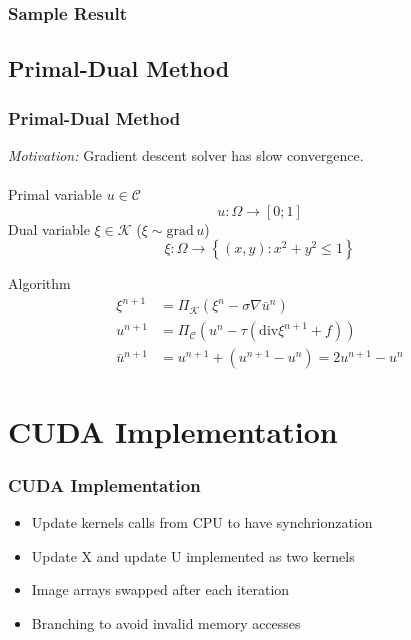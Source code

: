 \documentclass{beamer}
\begin{document}
\begin{frame}
  \frametitle{Sample Result}

\end{frame}

\subsection{Primal-Dual Method}

\begin{frame}
  \frametitle{Primal-Dual Method}
  \emph{Motivation:} Gradient descent solver has slow convergence.
  \\~\\
  Primal variable $ u \in \mathcal{C} $
  \begin{equation*}
    u : \Omega \to [0; 1]
  \end{equation*}
  Dual variable $ \xi \in \mathcal{K} $ \quad ($ \xi \sim \mathrm{grad} \, u $)
  \begin{equation*}
    \xi : \Omega \to \left\{ (x, y) : x^2 + y^2 \le 1 \right\}
  \end{equation*}

  Algorithm
  \begin{align*}
    \xi^{n+1} &= \Pi_{\mathcal{K}}(\xi^n - \sigma \nabla \bar{u}^n)
    \\
    u^{n+1} &= \Pi_{\mathcal{C}}(u^n - \tau (\mathrm{div} \xi^{n+1} + f))
    \\
    \bar{u}^{n+1} &= u^{n+1} + (u^{n+1} - u^n) = 2 u^{n+1} - u^n
  \end{align*}
\end{frame}

\section{CUDA Implementation}

\begin{frame}
  \frametitle{CUDA Implementation}
  \begin{itemize}
  \item Update kernels calls from CPU to have synchrionzation

  \item Update X and update U implemented as two kernels

  \item Image arrays swapped after each iteration

  \item Branching to avoid invalid memory accesses
  
  \end{itemize}

\end{frame}
\end{document}
